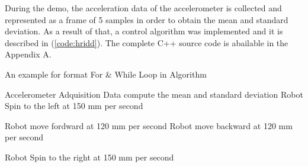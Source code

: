  During the demo, the acceleration data of the accelerometer is collected and
represented as a frame of 5 samples in order to obtain the mean and standard deviation.
As a result of that, a control algorithm was implemented and it is described in (\ref{code:hridd}). 
The complete C++ source code is abailable in the Appendix A.




\begin{algorithm}[h!]
  \caption{An example for format For \& While Loop in Algorithm}
  \begin{algorithmic}[1]
      \State Accelerometer Adquisition Data 
		\State  compute the mean and standard deviation
		\State Robot Spin to the left at 150 mm per second
		\EndIf
		
		    \State Robot move fordward at 120 mm per second
		    \Else 
		    \State Robot move backward at 120 mm per second
		    \EndIf
		\EndIf
		
		\State Robot Spin to the right at 150 mm per second
		\EndIf		
	
	   \EndIf
	   
	   
  \EndWhile
  \label{code:hridd}
  \end{algorithmic}
\end{algorithm}



